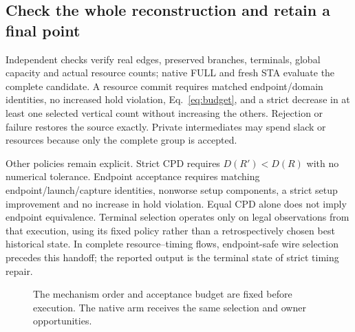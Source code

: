 \documentclass[conference,10pt]{IEEEtran}
\begin{document}
\subsection{Check the whole reconstruction and retain a final point}
Independent checks verify real edges, preserved branches, terminals, global capacity and actual resource counts; native FULL and fresh STA evaluate the complete candidate. A resource commit requires matched endpoint/domain identities, no increased hold violation, Eq.~\ref{eq:budget}, and a strict decrease in at least one selected vertical count without increasing the others. Rejection or failure restores the source exactly. Private intermediates may spend slack or resources because only the complete group is accepted.

Other policies remain explicit. Strict CPD requires $D(R')<D(R)$ with no numerical tolerance. Endpoint acceptance requires matching endpoint/launch/capture identities, nonworse setup components, a strict setup improvement and no increase in hold violation. Equal CPD alone does not imply endpoint equivalence. Terminal selection operates only on legal observations from that execution, using its fixed policy rather than a retrospectively chosen best historical state. In complete resource--timing flows, endpoint-safe wire selection precedes this handoff; the reported output is the terminal state of strict timing repair.

\begin{figure}[t]
\centering\footnotesize
{}
\caption{The mechanism order and acceptance budget are fixed before execution. The native arm receives the same selection and owner opportunities.}
\label{fig:algorithm}
\end{figure}
\end{document}

